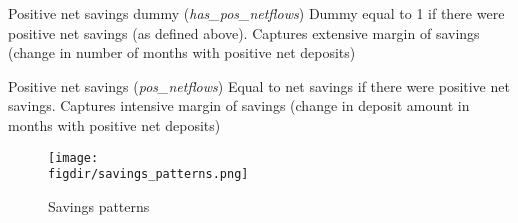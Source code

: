 Positive net savings dummy (\textit{has\_pos\_netflows})
Dummy equal to 1 if there were positive net savings (as defined above).
Captures extensive margin of savings (change in number of months with positive
net deposits)

Positive net savings (\textit{pos\_netflows})
Equal to net savings if there were positive net savings.
Captures intensive margin of savings (change in deposit amount in months with
positive net deposits)

\begin{figure}[H]
    \centering
    \caption{Savings patterns}%
    \texttt{[image: \\figdir/savings\_patterns.png]}
    \label{fig:\figdir/savings_patterns}

\end{figure}





